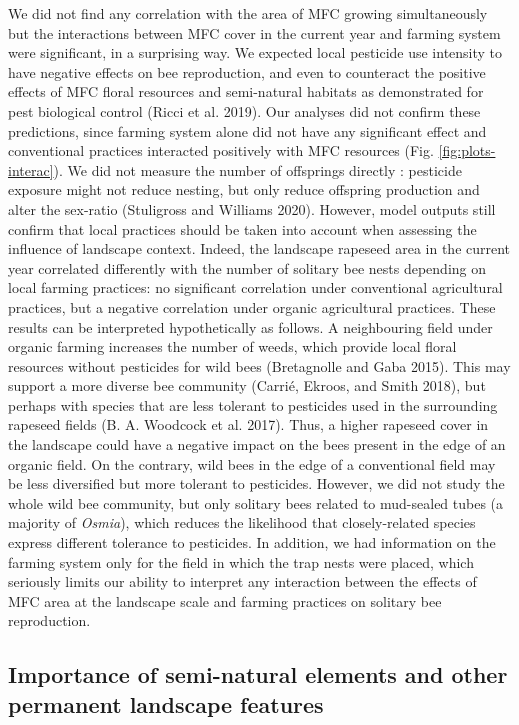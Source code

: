 \documentclass[smallextended]{svjour3}       %
\begin{document}
We did not find any correlation with the area of MFC growing
simultaneously but the interactions between MFC cover in the current
year and farming system were significant, in a surprising way. We
expected local pesticide use intensity to have negative effects on bee
reproduction, and even to counteract the positive effects of MFC floral
resources and semi-natural habitats as demonstrated for pest biological
control (Ricci et al. 2019). Our analyses did not confirm these
predictions, since farming system alone did not have any significant
effect and conventional practices interacted positively with MFC
resources (Fig. \ref{fig:plots-interac}). We did not measure the number
of offsprings directly : pesticide exposure might not reduce nesting,
but only reduce offspring production and alter the sex-ratio (Stuligross
and Williams 2020). However, model outputs still confirm that local
practices should be taken into account when assessing the influence of
landscape context. Indeed, the landscape rapeseed area in the current
year correlated differently with the number of solitary bee nests
depending on local farming practices: no significant correlation under
conventional agricultural practices, but a negative correlation under
organic agricultural practices. These results can be interpreted
hypothetically as follows. A neighbouring field under organic farming
increases the number of weeds, which provide local floral resources
without pesticides for wild bees (Bretagnolle and Gaba 2015). This may
support a more diverse bee community (Carrié, Ekroos, and Smith 2018),
but perhaps with species that are less tolerant to pesticides used in
the surrounding rapeseed fields (B. A. Woodcock et al. 2017). Thus, a
higher rapeseed cover in the landscape could have a negative impact on
the bees present in the edge of an organic field. On the contrary, wild
bees in the edge of a conventional field may be less diversified but
more tolerant to pesticides. However, we did not study the whole wild
bee community, but only solitary bees related to mud-sealed tubes (a
majority of \emph{Osmia}), which reduces the likelihood that
closely-related species express different tolerance to pesticides. In
addition, we had information on the farming system only for the field in
which the trap nests were placed, which seriously limits our ability to
interpret any interaction between the effects of MFC area at the
landscape scale and farming practices on solitary bee reproduction.

\hypertarget{importance-of-semi-natural-elements-and-other-permanent-landscape-features}{%
\subsection{Importance of semi-natural elements and other permanent
landscape
features}\label{importance-of-semi-natural-elements-and-other-permanent-landscape-features}}
\end{document}
